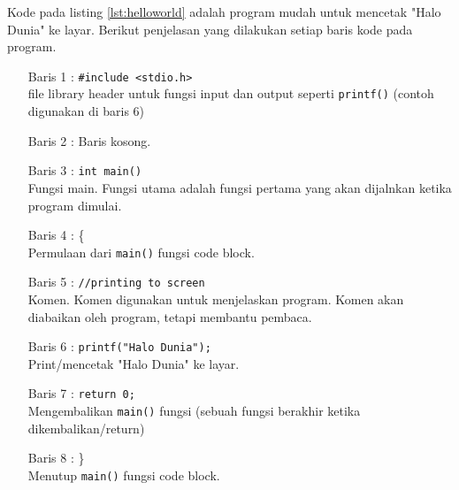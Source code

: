 Kode pada listing \ref{lst:helloworld} adalah program mudah untuk mencetak "Halo Dunia" ke layar. Berikut penjelasan yang dilakukan setiap baris kode pada program.
\begin{itemize}\setlength\itemsep{-0.1em}

	\item [Baris 1 :] \verb|#include <stdio.h>|\\ file library header untuk fungsi input dan output seperti \verb|printf()| (contoh digunakan di baris 6)
	\item[Baris 2 :] Baris kosong. 
	\item [Baris 3 :] \verb|int main()|\\ Fungsi main. Fungsi utama adalah fungsi pertama yang akan dijalnkan ketika program dimulai.
	\item[Baris 4 :] \{ \\Permulaan dari \verb|main()| fungsi code block.
	\item[Baris 5 :]\verb|//printing to screen|\\ Komen. Komen digunakan untuk menjelaskan program. Komen akan diabaikan oleh program, tetapi membantu pembaca.
	\item[Baris 6 :]\verb|printf("Halo Dunia");|\\ Print/mencetak "Halo Dunia" ke layar.
	\item[Baris 7 :] \verb|return 0;| \\Mengembalikan \verb|main()| fungsi (sebuah fungsi berakhir ketika dikembalikan/return)
	\item [Baris 8 :] \}\\Menutup \verb|main()| fungsi code block.

\end{itemize}
